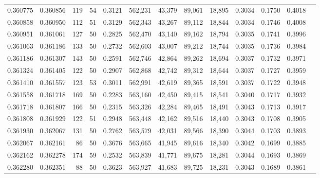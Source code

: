 \begin{tabular}{rrrrrrrrrrrrr}
0.360775 & 0.360856 &   119 &  54 &                                     0.3121 & 562,231 &  43,379 &  89,061 &  18,895 & 0.3034 & 0.1750 & 0.4018 \\
0.360858 & 0.360950 &   112 &  51 &                                     0.3129 & 562,343 &  43,267 &  89,112 &  18,844 & 0.3034 & 0.1746 & 0.4008 \\
0.360951 & 0.361061 &   127 &  50 &                                     0.2825 & 562,470 &  43,140 &  89,162 &  18,794 & 0.3035 & 0.1741 & 0.3996 \\
0.361063 & 0.361186 &   133 &  50 &                                     0.2732 & 562,603 &  43,007 &  89,212 &  18,744 & 0.3035 & 0.1736 & 0.3984 \\
0.361186 & 0.361307 &   143 &  50 &                                     0.2591 & 562,746 &  42,864 &  89,262 &  18,694 & 0.3037 & 0.1732 & 0.3971 \\
0.361324 & 0.361405 &   122 &  50 &                                     0.2907 & 562,868 &  42,742 &  89,312 &  18,644 & 0.3037 & 0.1727 & 0.3959 \\
0.361410 & 0.361557 &   123 &  53 &                                     0.3011 & 562,991 &  42,619 &  89,365 &  18,591 & 0.3037 & 0.1722 & 0.3948 \\
0.361558 & 0.361718 &   169 &  50 &                                     0.2283 & 563,160 &  42,450 &  89,415 &  18,541 & 0.3040 & 0.1717 & 0.3932 \\
0.361718 & 0.361807 &   166 &  50 &                                     0.2315 & 563,326 &  42,284 &  89,465 &  18,491 & 0.3043 & 0.1713 & 0.3917 \\
0.361808 & 0.361929 &   122 &  51 &                                     0.2948 & 563,448 &  42,162 &  89,516 &  18,440 & 0.3043 & 0.1708 & 0.3905 \\
0.361930 & 0.362067 &   131 &  50 &                                     0.2762 & 563,579 &  42,031 &  89,566 &  18,390 & 0.3044 & 0.1703 & 0.3893 \\
0.362067 & 0.362161 &    86 &  50 &                                     0.3676 & 563,665 &  41,945 &  89,616 &  18,340 & 0.3042 & 0.1699 & 0.3885 \\
0.362162 & 0.362278 &   174 &  59 &                                     0.2532 & 563,839 &  41,771 &  89,675 &  18,281 & 0.3044 & 0.1693 & 0.3869 \\
0.362280 & 0.362351 &    88 &  50 &                                     0.3623 & 563,927 &  41,683 &  89,725 &  18,231 & 0.3043 & 0.1689 & 0.3861 \\

\end{tabular}
